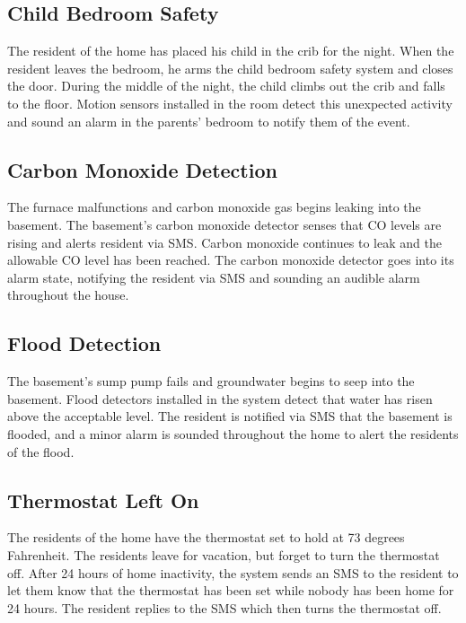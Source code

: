 \documentclass{report}
\begin{document}
\subsection*{Child Bedroom Safety}

The resident of the home has placed his child in the crib for the night. When
the resident leaves the bedroom, he arms the child bedroom safety system and
closes the door. During the middle of the night, the child climbs out the crib
and falls to the floor. Motion sensors installed in the room detect this
unexpected activity and sound an alarm in the parents' bedroom to notify them
of the event.

\subsection*{Carbon Monoxide Detection}

The furnace malfunctions and carbon monoxide gas begins leaking into the
basement. The basement's carbon monoxide detector senses that CO levels are
rising and alerts resident via SMS. Carbon monoxide continues to leak and the
allowable CO level has been reached. The carbon monoxide detector goes into its
alarm state, notifying the resident via SMS and sounding an audible alarm
throughout the house.

\subsection*{Flood Detection}

The basement's sump pump fails and groundwater begins to seep into the
basement.  Flood detectors installed in the system detect that water has risen
above the acceptable level. The resident is notified via SMS that the basement
is flooded, and a minor alarm is sounded throughout the home to alert the
residents of the flood.

\subsection*{Thermostat Left On}

The residents of the home have the thermostat set to hold at 73 degrees
Fahrenheit.  The residents leave for vacation, but forget to turn the
thermostat off. After 24 hours of home inactivity, the system sends an SMS to
the resident to let them know that the thermostat has been set while nobody has
been home for 24 hours. The resident replies to the SMS which then turns the
thermostat off.
\end{document}
